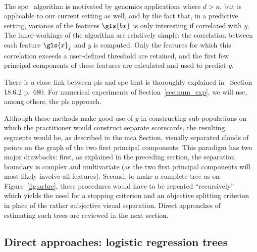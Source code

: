 \paragraph{}

The \gls{spc}~\cite{bair2006prediction} algorithm is motivated by genomics applications where $d > n$, but is applicable to our current setting as well, and by the fact that, in a predictive setting, variance of the features $\gls{bx}$ is only interesting if correlated with $y$. The inner-workings of the algorithm are relatively simple: the correlation between each feature $\gls{x}_j$ and $y$ is computed. Only the features for which this correlation exceeds a user-defined threshold are retained, and the first few principal components of these features are calculated and used to predict $y$.

There is a close link between \gls{pls} and \gls{spc} that is thoroughly explained in~\cite{friedman2001elements} Section 18.6.2 p.\ 680. For numerical experiments of Section~\ref{sec:num_exp}, we will use, among others, the \gls{pls} approach.

\medskip

Although these methods make good use of $y$ in constructing sub-populations on which the practitioner would construct separate scorecards, the resulting segments would be, as described in the \gls{mca} Section, visually separated clouds of points on the graph of the two first principal components. This paradigm has two major drawbacks: first, as explained in the preceding section, the separation boundary is complex and multivariate (as the two first principal components will most likely involve all features). Second, to make a complete tree as on Figure~\ref{fig:arbre}, these procedures would have to be repeated ``recursively'' which yields the need for a stopping criterion and an objective splitting criterion in place of the rather subjective visual separation. Direct approaches of estimating such trees are reviewed in the next section.

\subsection{Direct approaches: logistic regression trees} \label{subsec:direct}

\paragraph{}

